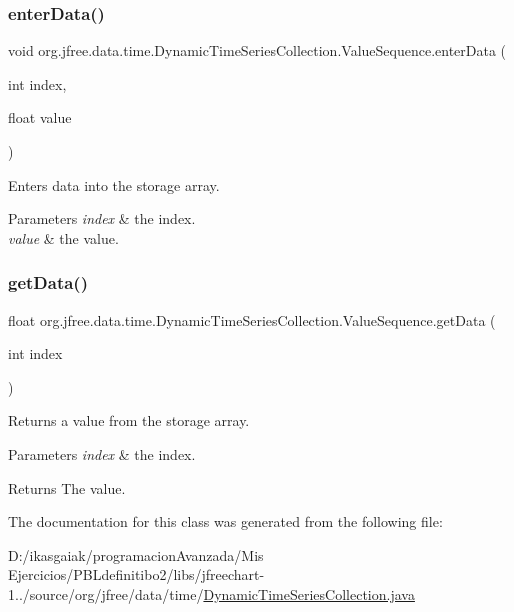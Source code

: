 \subsubsection{\texorpdfstring{enter\+Data()}{enterData()}}
{\footnotesize\ttfamily void org.\+jfree.\+data.\+time.\+Dynamic\+Time\+Series\+Collection.\+Value\+Sequence.\+enter\+Data (\begin{DoxyParamCaption}\item[{int}]{index,  }\item[{float}]{value }\end{DoxyParamCaption})}

Enters data into the storage array.


\begin{DoxyParams}{Parameters}
{\em index} & the index. \\
\hline
{\em value} & the value. \\
\hline
\end{DoxyParams}
\mbox{\label{classorg_1_1jfree_1_1data_1_1time_1_1_dynamic_time_series_collection_1_1_value_sequence_a21ad1cdf4a6e9bc520bd5ea80be19f5d}} 
\subsubsection{\texorpdfstring{get\+Data()}{getData()}}
{\footnotesize\ttfamily float org.\+jfree.\+data.\+time.\+Dynamic\+Time\+Series\+Collection.\+Value\+Sequence.\+get\+Data (\begin{DoxyParamCaption}\item[{int}]{index }\end{DoxyParamCaption})}

Returns a value from the storage array.


\begin{DoxyParams}{Parameters}
{\em index} & the index.\\
\hline
\end{DoxyParams}
\begin{DoxyReturn}{Returns}
The value. 
\end{DoxyReturn}


The documentation for this class was generated from the following file\+:\begin{DoxyCompactItemize}
\item 
D\+:/ikasgaiak/programacion\+Avanzada/\+Mis Ejercicios/\+P\+B\+Ldefinitibo2/libs/jfreechart-\/1../source/org/jfree/data/time/\mbox{\hyperlink{_dynamic_time_series_collection_8java}{Dynamic\+Time\+Series\+Collection.\+java}}\end{DoxyCompactItemize}
